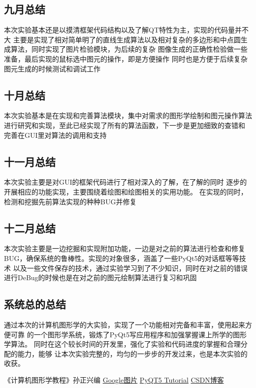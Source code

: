 \documentclass[a4paper,UTF8]{article}
\theoremstyle{definition}
\begin{document}
\subsection{九月总结}
本次实验基本还是以摸清框架代码结构以及了解QT特性为主，实现的代码量并不大
主要是实现了相对简单明了的直线生成算法以及相对复杂的多边形和中点圆生成算法，同时实现了图片检验模块，为后续的复杂
图像生成的正确性检验做一些准备，最后实现的鼠标选中图元的操作，即是方便操作
同时也是方便于后续复杂图元生成的时候测试和调试工作

\subsection{十月总结}
本次实验基本是在实现和完善算法模块，集中对需求的图形学绘制和图元操作算法
进行研究和实现，至此已经实现了所有的算法函数，下一步是更加细致的查错和
完善在GUI里对算法的调用和支持

\subsection{十一月总结}
本次实验主要是对GUI的框架代码进行了相对深入的了解，在了解的同时
逐步的开展相应的功能实现，主要围绕着绘图和绘图相关的实用功能。
在实现的同时，检测和挖掘先前算法实现的种种BUG并修复

\subsection{十二月总结}
本次实验主要是一边挖掘和实现附加功能，一边是对之前的算法进行检查和修复
BUG，确保系统的鲁棒性。实现的对象很多，涵盖了一些PyQt5的对话框等等技术
以及一些文件保存的技术，通过实验学习到了不少知识，同时在对之前的错误
进行DeBug的时候也是在对之前的图元绘制算法进行复习和巩固

\subsection{系统总的总结}
通过本次的计算机图形学的大实验，实现了一个功能相对完备和丰富，使用起来方便可靠
的一个图形学系统，锻炼了PyQt5写应用程序和加强掌握课上所学的图形学算法。
同时在这个较长时间的开发里，强化了实验和代码进度的掌握和合理分配的能力，能够
让本次实验完整的，均匀的一步步的开发过来，也是本次实验的收获。




\begin{thebibliography}{99}  
    《计算机图形学教程》孙正兴编 
     \href{https://www.google.com/imghp?hl=zh-CN&ogbl}{Google图片}
     \href{https://build-system.fman.io/pyqt5-tutorial}{PyQT5 Tutorial}
     \href{https://blog.csdn.net/shenziheng1/article/details/54411098}{CSDN博客}
\end{thebibliography}
\end{document}
